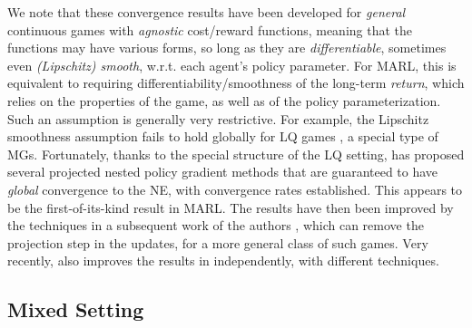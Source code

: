  
 

 





 
 
 

We note that these convergence results have been developed for \emph{general}  continuous  games with \emph{agnostic} cost/reward functions, meaning that the functions may have various forms, so long as they are \emph{differentiable}, sometimes even \emph{(Lipschitz) smooth}, w.r.t.  each agent's policy parameter. For MARL, this is equivalent to requiring   differentiability/smoothness of the long-term \emph{return}, which relies on the properties of the  game, as well as of  the policy parameterization. Such an assumption is generally very restrictive. For example,   the Lipschitz smoothness assumption fails to hold globally for LQ games \cite{zhang2019policyb,mazumdar2019policy,bu2019global}, a special type of MGs.  Fortunately, thanks to the special structure of the LQ setting, \cite{zhang2019policyb} has proposed several   projected nested policy gradient methods that are guaranteed to have \emph{global} convergence to the NE, with convergence rates established.  This appears to be the first-of-its-kind result in MARL.  The results have then been improved by the techniques in a subsequent work of the authors  \cite{zhang2019policy}, which can  remove the projection step in the updates, for a more general class of such games. 
Very recently, \cite{bu2019global} also improves the results in  \cite{zhang2019policyb} independently, with different techniques.  

   
        
  

\subsection{Mixed Setting}\label{subsec:mixed_setting}

